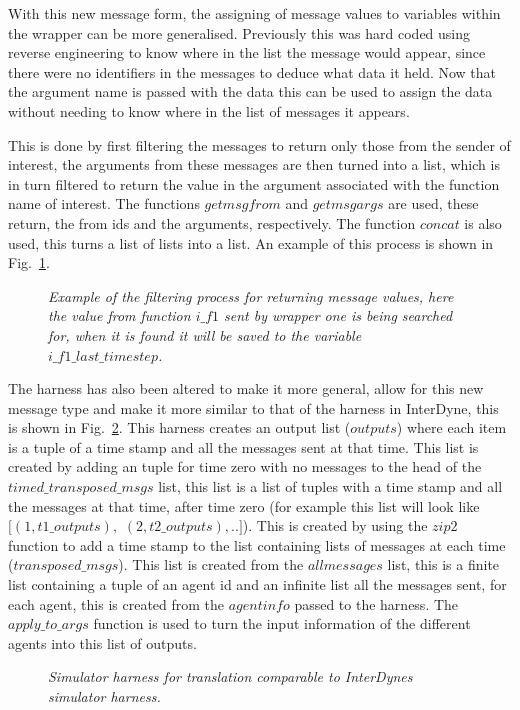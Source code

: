 \documentclass{article}
\begin{document}
With this new message form, the assigning of message values to variables within the wrapper can be more generalised. Previously this was hard coded using reverse engineering to know where in the list the message would appear, since there were no identifiers in the messages to deduce what data it held. Now that the argument name is passed with the data this can be used to assign the data without needing to know where in the list of messages it appears. 


This is done by first filtering the messages to return only those from the sender of interest, the arguments from these messages are then turned into a list, which is in turn filtered to return the value in the argument associated with the function name of interest. The functions $getmsgfrom$ and $getmsgargs$ are used, these return, the from ids and the arguments, respectively. The function $concat$ is also used, this turns a list of lists into a list. An example of this process is shown in Fig.~\ref{fig:filter8}. 
\begin{figure}[H]
	\centering
	
	\caption{\it Example of the filtering process for returning message values, here the value from function $i\_f1$ sent by wrapper one is being searched for, when it is found it will be saved to the variable $i\_f1\_last\_timestep$.}
	\label{fig:filter8}
\end{figure} 

The harness has also been altered to make it more general, allow for this new message type and make it more similar to that of the harness in InterDyne, this is shown in Fig.~\ref{fig:harn8}. This harness creates an output list ($outputs$) where each item is a tuple of a time stamp and all the messages sent at that time. This list is created by adding an tuple for time zero with no messages to the head of the $timed\_transposed\_msgs$ list, this list is a list of tuples with a time stamp and all the messages at that time, after time zero (for example this list will look like $[(1, t1\_outputs),$ $(2, t2\_outputs), ..]$). This is created by using the $zip2$ function to add a time stamp to the list containing lists of messages at each time ($transposed\_msgs$). This list is created from the $allmessages$ list, this is a finite list containing a tuple of an agent id and an infinite list all the messages sent, for each agent, this is created from the $agentinfo$ passed to the harness. The $apply\_to\_args$ function is used to turn the input information of the different agents into this list of outputs.
\begin{figure}[H]
	\centering
	
	\caption{\it Simulator harness for translation comparable to InterDynes simulator harness.  }
	\label{fig:harn8}
\end{figure} 
\end{document}
